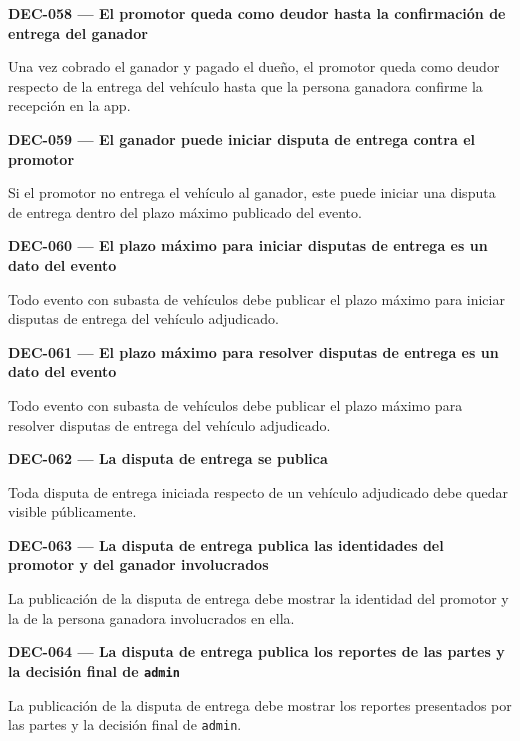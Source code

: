 \documentclass[10pt,letterpaper]{article}
\begin{document}
\noindent\textbf{DEC-058 --- El promotor queda como deudor hasta la confirmación de entrega del ganador}\par
Una vez cobrado el ganador y pagado el dueño, el promotor queda como deudor respecto de la entrega del vehículo hasta que la persona ganadora confirme la recepción en la app.\par\vspace{0.45em}
\noindent\textbf{DEC-059 --- El ganador puede iniciar disputa de entrega contra el promotor}\par
Si el promotor no entrega el vehículo al ganador, este puede iniciar una disputa de entrega dentro del plazo máximo publicado del evento.\par\vspace{0.45em}
\noindent\textbf{DEC-060 --- El plazo máximo para iniciar disputas de entrega es un dato del evento}\par
Todo evento con subasta de vehículos debe publicar el plazo máximo para iniciar disputas de entrega del vehículo adjudicado.\par\vspace{0.45em}
\noindent\textbf{DEC-061 --- El plazo máximo para resolver disputas de entrega es un dato del evento}\par
Todo evento con subasta de vehículos debe publicar el plazo máximo para resolver disputas de entrega del vehículo adjudicado.\par\vspace{0.45em}
\noindent\textbf{DEC-062 --- La disputa de entrega se publica}\par
Toda disputa de entrega iniciada respecto de un vehículo adjudicado debe quedar visible públicamente.\par\vspace{0.45em}
\noindent\textbf{DEC-063 --- La disputa de entrega publica las identidades del promotor y del ganador involucrados}\par
La publicación de la disputa de entrega debe mostrar la identidad del promotor y la de la persona ganadora involucrados en ella.\par\vspace{0.45em}
\noindent\textbf{DEC-064 --- La disputa de entrega publica los reportes de las partes y la decisión final de \texttt{admin}}\par
La publicación de la disputa de entrega debe mostrar los reportes presentados por las partes y la decisión final de \texttt{admin}.\par\vspace{0.45em}
\end{document}
